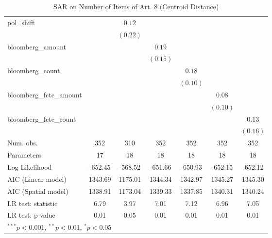 \begin{table}[!h]
\begin{center}
\begin{tabular}{l c c c c c c }
pol\_shift              &              & $0.12$       &              &              &              &              \\
                        &              & $(0.22)$     &              &              &              &              \\
bloomberg\_amount       &              &              & $0.19$       &              &              &              \\
                        &              &              & $(0.15)$     &              &              &              \\
bloomberg\_count        &              &              &              & $0.18$       &              &              \\
                        &              &              &              & $(0.10)$     &              &              \\
bloomberg\_fctc\_amount &              &              &              &              & $0.08$       &              \\
                        &              &              &              &              & $(0.10)$     &              \\
bloomberg\_fctc\_count  &              &              &              &              &              & $0.13$       \\
                        &              &              &              &              &              & $(0.16)$     \\
\midrule
Num. obs.               & 352          & 310          & 352          & 352          & 352          & 352          \\
Parameters              & 17           & 18           & 18           & 18           & 18           & 18           \\
Log Likelihood          & -652.45      & -568.52      & -651.66      & -650.93      & -652.15      & -652.12      \\
AIC (Linear model)      & 1343.69      & 1175.01      & 1344.34      & 1342.97      & 1345.27      & 1345.30      \\
AIC (Spatial model)     & 1338.91      & 1173.04      & 1339.33      & 1337.85      & 1340.31      & 1340.24      \\
LR test: statistic      & 6.79         & 3.97         & 7.01         & 7.12         & 6.96         & 7.05         \\
LR test: p-value        & 0.01         & 0.05         & 0.01         & 0.01         & 0.01         & 0.01         \\
\bottomrule
\multicolumn{7}{l}{\scriptsize{$^{***}p<0.001$, $^{**}p<0.01$, $^*p<0.05$}}
\end{tabular}
\caption{SAR on Number of Items of Art. 8 (Centroid Distance)}
\label{table:coefficients}
\end{center}
\end{table}

